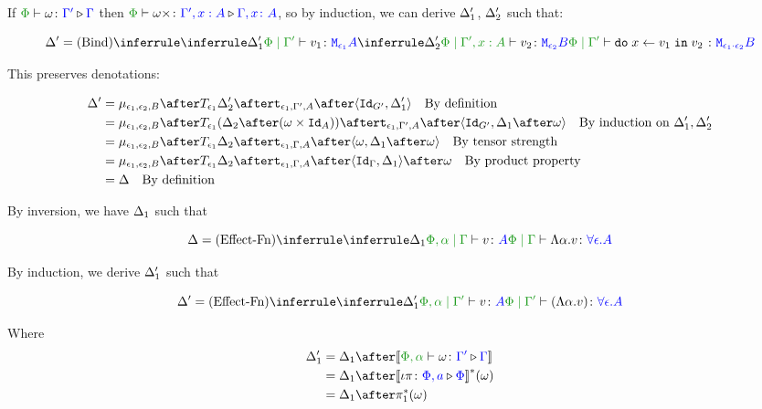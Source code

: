 {    If $\ewrel{\P}{\w}{\G'}{\G}$ then $\ewrel{\P}{\w\x}{\G',x:A}{\gax}$, so by induction, we can derive $\Delta_1'$, $\Delta_2'$ such that:

    \begin{equation}
        \D' = \ntreeruleII{Bind}{
            \treeruleI{\D_1'}{\etyperelation{\P}{\G'}{v_1}{\M{\e_1}{A}}}
            }{
            \treeruleI{\D_2'}{\etyperelation{\P}{\G',x: A}{v_2}{\M{\e_2}{B}}}
        }{
            \etyperelation{\P}{\G'}{\doin{x}{v_1}{v_2}}{\M{\e_1\dot\e_2}{B}}
        }
    \end{equation}

    This preserves denotations:

    \begin{align}
        \D' & = \bind{\e_1}{\e_2}{B}\after\T{\e_1}{\D_2'}\after\tstrength{\e_1}{\G'}{A}\after\pr{\Id{G'}}{\D_1'}\qt{By definition}\\
        & = \bind{\e_1}{\e_2}{B}\after\T{\e_1}{(\D_2\after(\w\times\Id{A}))}\after\tstrength{\e_1}{\G'}{A}\after\pr{\Id{G'}}{\D_1\after\w}\qt{By induction on $\D_1', \D_2'$}\\
        & = \bind{\e_1}{\e_2}{B}\after\T{\e_1}{\D_2}\after\tstrength{\e_1}{\G}{A}\after\pr{\w}{\D_1\after\w}\qt{By tensor strength}\\
        & = \bind{\e_1}{\e_2}{B}\after\T{\e_1}{\D_2}\after\tstrength{\e_1}{\G}{A}\after\pr{\idg}{\D_1}\after\w\qt{By product property}\\
        & = \D \qt{By definition}
    \end{align}




    By inversion, we have $\Delta_1$ such that
    
    \begin{equation}
        \D = \ntreeruleI{Effect-Fn}{\treeruleI{\D_1}{\etyperelation{\P,\a}{\G}{v}{A}}}{\gpetyperelation{\elam{\a}{v}}{\all{\e}{A}}}
    \end{equation}
    
    By induction, we derive $\Delta_1'$ such that
    
    \begin{equation}
        \D' = \ntreeruleI{Effect-Fn}{\treeruleI{\D_1'}{\etyperelation{\P,\a}{\G'}{v}{A}}}{\etyperelation{\P}{\G'}{(\elam{\a}{v})}{\all{\e}{A}}}
    \end{equation}
    
    Where 
    \begin{align}
        \D_1' & = \D_1\after\deno{\ewrel{\P,\a}{\w}{\G'}{\G}}\\
        & = \D_1\after\deno{\wrel{\i\pi}{\P,a}{\P}}\star(\w)\\
        & = \D_1\after\pstar(\w)
    \end{align}
    
}
